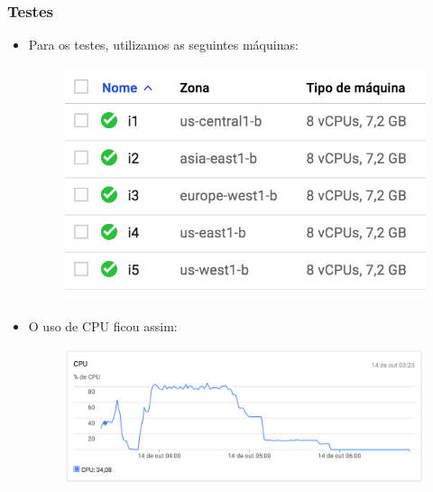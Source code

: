 \documentclass{beamer}
\begin{document}
\begin{frame}
	\frametitle{Testes}
	\begin{itemize}
		\item Para os testes, utilizamos as seguintes máquinas:
		\begin{figure}[!h]
			\centering
			\includegraphics[scale=0.37]{13.png}
		\end{figure}
		\item O uso de CPU ficou assim:
		\begin{figure}[!h]
			\centering
			\includegraphics[scale=0.37]{12.png}
		\end{figure}
	\end{itemize}
\end{frame}
\end{document}

